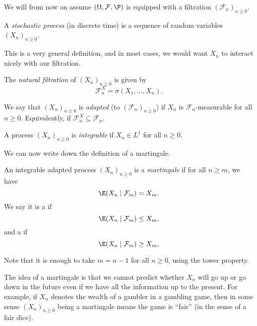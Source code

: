 \documentclass[a4paper]{article}
\begin{document}
We will from now on assume $(\Omega, \mathcal{F}, \P)$ is equipped with a filtration $(\mathcal{F}_n)_{n \geq 0}$.

\begin{defi}
  A \emph{stochastic process} (in discrete time) is a sequence of random variables $(X_n)_{n \geq 0}$.
\end{defi}

This is a very general definition, and in most cases, we would want $X_n$ to interact nicely with our filtration.
\begin{defi}
  The \emph{natural filtration} of $(X_n)_{n \geq 0}$ is given by
  \[
    \mathcal{F}_n^X = \sigma(X_1, \ldots, X_n).
  \]
\end{defi}

\begin{defi}
  We say that $(X_n)_{n \geq 0}$ is \emph{adapted} (to $(\mathcal{F}_n)_{n \geq 0}$) if $X_n$ is $\mathcal{F}_n$-measurable for all $n \geq 0$. Equivalently, if $\mathcal{F}^X_n \subseteq \mathcal{F}_n$.
\end{defi}

\begin{defi}
  A process $(X_n)_{n \geq 0}$ is \emph{integrable} if $X_n \in L^1$ for all $n \geq 0$.
\end{defi}

We can now write down the definition of a martingale.
\begin{defi}[Martingale]
  An integrable adapted process $(X_n)_{n \geq 0}$ is a \emph{martingale} if for all $n \geq m$, we have
  \[
    \E(X_n \mid \mathcal{F}_m) = X_m.
  \]
  We say it is a  if
  \[
    \E(X_n \mid \mathcal{F}_m) \leq X_m,
  \]
  and a  if
  \[
    \E(X_n \mid \mathcal{F}_m) \geq X_m,
  \]
\end{defi}
Note that it is enough to take $m = n - 1$ for all $n \geq 0$, using the tower property.

The idea of a martingale is that we cannot predict whether $X_n$ will go up or go down in the future even if we have all the information up to the present. For example, if $X_n$ denotes the wealth of a gambler in a gambling game, then in some sense $(X_n)_{n \geq 0}$ being a martingale means the game is ``fair'' (in the sense of a fair dice).
\end{document}
